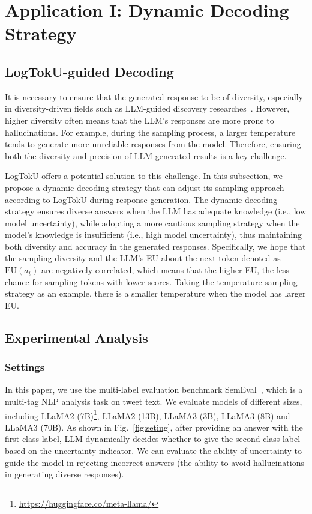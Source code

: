 \section{Application I: Dynamic Decoding Strategy}\label{sec:case1}


\subsection{LogTokU-guided Decoding}
It is necessary to ensure that the generated response to be of diversity, especially in diversity-driven fields such as LLM-guided discovery researches~\cite{peng2024large}. However, higher diversity often means that the LLM's responses are more prone to hallucinations. For example, during the sampling process, a larger temperature tends to generate more unreliable responses from the model. Therefore, ensuring both the diversity and precision of LLM-generated results is a key challenge.

LogTokU offers a potential solution to this challenge. In this subsection, we propose a dynamic decoding strategy that can adjust its sampling approach according to LogTokU during response generation. The dynamic decoding strategy ensures diverse answers when the LLM has adequate knowledge (i.e., low model uncertainty), while adopting a more cautious sampling strategy when the model's knowledge is insufficient (i.e., high model uncertainty), thus maintaining both diversity and accuracy in the generated responses. Specifically, we hope that the sampling diversity and the LLM's EU about the next token denoted as $\text{EU}(a_t)$ are negatively correlated,
which means that the higher EU, the less chance for sampling tokens with lower scores.
Taking the temperature sampling strategy as an example, there is a smaller temperature when the model has larger EU.

\subsection{Experimental Analysis}
\subsubsection{Settings}
In this paper, we use the multi-label evaluation benchmark SemEval~\cite{mohammad-etal-2018-semeval}, which is a multi-tag NLP analysis task on tweet text. We evaluate models of different sizes, including LLaMA2 (7B)\footnote{\href{https://huggingface.co/meta-llama/Llama-2-7b-chat-hf}{https://huggingface.co/meta-llama/}}, LLaMA2 (13B), LLaMA3 (3B), LLaMA3 (8B) and LLaMA3 (70B). As shown in Fig.~\ref{fig:seting}, after providing an answer with the first class label, LLM dynamically decides whether to give the second class label based on the uncertainty indicator. We can evaluate the ability of uncertainty to guide the model in rejecting incorrect answers (the ability to avoid hallucinations in generating diverse responses).

